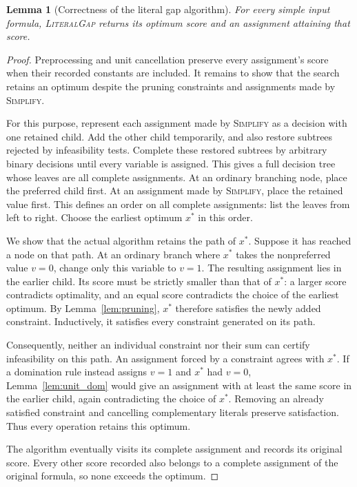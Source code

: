 \documentclass[11pt,a4paper]{article}
\newtheorem{lemma}[theorem]{Lemma}
\theoremstyle{definition}
\theoremstyle{remark}
\begin{document}
\begin{lemma}[Correctness of the literal gap algorithm]\label{lem:gap_correctness}
For every simple input formula, \textnormal{\textsc{LiteralGap}} returns its optimum
score and an assignment attaining that score.
\end{lemma}
\begin{proof}
Preprocessing and unit cancellation preserve every assignment's score
when their recorded constants are included. It remains to show that the
search retains an optimum despite the pruning constraints and assignments
made by \textnormal{\textsc{Simplify}}.

For this purpose, represent each assignment made by \textnormal{\textsc{Simplify}} as a
decision with one retained child. Add the other child temporarily, and also
restore subtrees rejected by infeasibility tests. Complete these restored
subtrees by arbitrary binary decisions until every variable is assigned.
This gives a full decision tree whose leaves are all complete assignments.
At an ordinary branching node, place the preferred child first. At an
assignment made by \textnormal{\textsc{Simplify}}, place the retained value first.
This defines an order on all complete assignments: list the leaves from
left to right. Choose the earliest optimum $x^*$ in this order.

We show that the actual algorithm retains the path of $x^*$. Suppose it
has reached a node on that path. At an ordinary branch where $x^*$ takes
the nonpreferred value $v=0$, change only this variable to $v=1$. The
resulting assignment lies in the earlier child. Its score must be strictly
smaller than that of $x^*$: a larger score contradicts optimality, and an
equal score contradicts the choice of the earliest optimum. By
Lemma~\ref{lem:pruning}, $x^*$ therefore satisfies the newly added constraint.
Inductively, it satisfies every constraint generated on its path.

Consequently, neither an individual constraint nor their sum can certify
infeasibility on this path. An assignment forced by a constraint agrees
with $x^*$. If a domination rule instead assigns $v=1$ and $x^*$ had $v=0$,
Lemma~\ref{lem:unit_dom} would give an assignment with at least the same score
in the earlier child, again contradicting the choice of $x^*$.
Removing an already satisfied constraint and cancelling complementary
literals preserve satisfaction. Thus every operation retains this optimum.

The algorithm eventually visits its complete assignment and records its
original score. Every other score recorded also belongs to a complete
assignment of the original formula, so none exceeds the optimum.
\end{proof}
\end{document}
